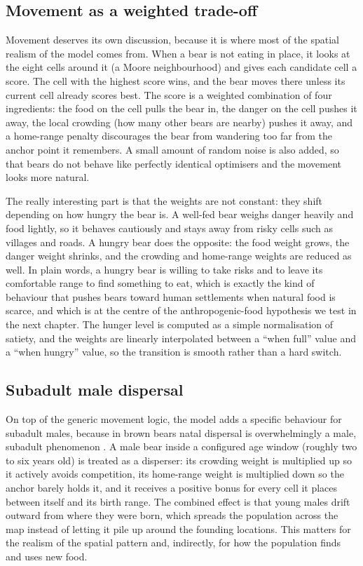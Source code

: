 \subsection{Movement as a weighted trade-off}

Movement deserves its own discussion, because it is where most of the spatial realism of the model comes from. When a bear is not eating in place, it looks at the eight cells around it (a Moore neighbourhood) and gives each candidate cell a score. The cell with the highest score wins, and the bear moves there unless its current cell already scores best. The score is a weighted combination of four ingredients: the food on the cell pulls the bear in, the danger on the cell pushes it away, the local crowding (how many other bears are nearby) pushes it away, and a home-range penalty discourages the bear from wandering too far from the anchor point it remembers. A small amount of random noise is also added, so that bears do not behave like perfectly identical optimisers and the movement looks more natural.

The really interesting part is that the weights are not constant: they shift depending on how hungry the bear is. A well-fed bear weighs danger heavily and food lightly, so it behaves cautiously and stays away from risky cells such as villages and roads. A hungry bear does the opposite: the food weight grows, the danger weight shrinks, and the crowding and home-range weights are reduced as well. In plain words, a hungry bear is willing to take risks and to leave its comfortable range to find something to eat, which is exactly the kind of behaviour that pushes bears toward human settlements when natural food is scarce, and which is at the centre of the anthropogenic-food hypothesis we test in the next chapter. The hunger level is computed as a simple normalisation of satiety, and the weights are linearly interpolated between a ``when full'' value and a ``when hungry'' value, so the transition is smooth rather than a hard switch.

\subsection{Subadult male dispersal}

On top of the generic movement logic, the model adds a specific behaviour for subadult males, because in brown bears natal dispersal is overwhelmingly a male, subadult phenomenon \cite{McLellan1989,Steyaert2012}. A male bear inside a configured age window (roughly two to six years old) is treated as a disperser: its crowding weight is multiplied up so it actively avoids competition, its home-range weight is multiplied down so the anchor barely holds it, and it receives a positive bonus for every cell it places between itself and its birth range. The combined effect is that young males drift outward from where they were born, which spreads the population across the map instead of letting it pile up around the founding locations. This matters for the realism of the spatial pattern and, indirectly, for how the population finds and uses new food.

